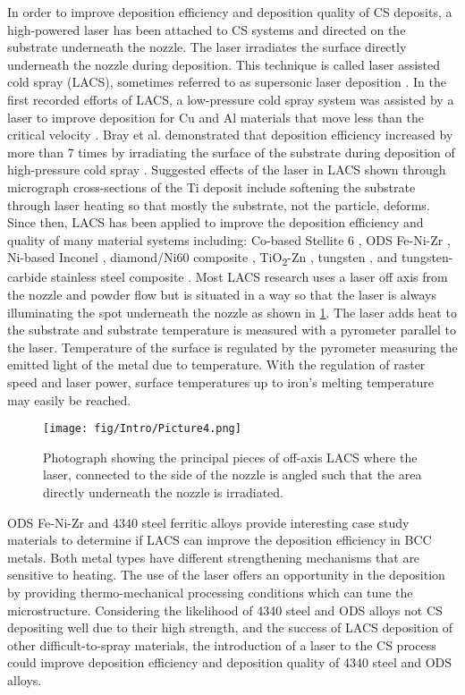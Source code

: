 		
		In order to improve deposition efficiency and deposition quality of CS deposits, a high-powered laser has been attached to CS systems and directed on the substrate underneath the nozzle. The laser irradiates the surface directly underneath the nozzle during deposition. This technique is called laser assisted cold spray (LACS), sometimes referred to as supersonic laser deposition \cite{RN173, RN597}. In the first recorded efforts of LACS, a low-pressure cold spray system was assisted by a laser to improve deposition for Cu and Al materials that move less than the critical velocity \cite{RN3366}. Bray et al. demonstrated that deposition efficiency increased by more than 7 times by irradiating the surface of the substrate during deposition of high-pressure cold spray \cite{RN173}. Suggested effects of the laser in LACS shown through micrograph cross-sections of the Ti deposit include softening the substrate through laser heating so that mostly the substrate, not the particle, deforms. Since then, LACS has been applied to improve the deposition efficiency and quality of many material systems including: Co-based Stellite 6 \cite{RN1390, RN1406, RN780}, ODS Fe-Ni-Zr \cite{RN383}, Ni-based Inconel \cite{RN1397}, diamond/Ni60 composite \cite{RN1407}, TiO\textsubscript{2}-Zn \cite{RN1402}, tungsten \cite{RN156}, and tungsten-carbide stainless steel composite \cite{RN2245}. Most LACS research uses a laser off axis from the nozzle and powder flow but is situated in a way so that the laser is always illuminating the spot underneath the nozzle as shown in \ref{fig:Intro4}. The laser adds heat to the substrate and substrate temperature is measured with a pyrometer parallel to the laser. Temperature of the surface is regulated by the pyrometer measuring the emitted light of the metal due to temperature. With the regulation of raster speed and laser power, surface temperatures up to iron’s melting temperature may easily be reached. 
		
		
		
		
		
	
		\begin{figure}
			\centering
			\texttt{[image: fig/Intro/Picture4.png]}
			\caption{Photograph showing the principal pieces of off-axis LACS where the laser, connected to the side of the nozzle is angled such that the area directly underneath the nozzle is irradiated.}
			\label{fig:Intro4}
		\end{figure}
		
		
		
		
		ODS Fe-Ni-Zr and 4340 steel ferritic alloys provide interesting case study materials to determine if LACS can improve the deposition efficiency in BCC metals. Both metal types have different strengthening mechanisms that are sensitive to heating. The use of the laser offers an opportunity in the deposition by providing thermo-mechanical processing conditions which can tune the microstructure. Considering the likelihood of 4340 steel and ODS alloys not CS depositing well due to their high strength, and the success of LACS deposition of other difficult-to-spray materials, the introduction of a laser to the CS process could improve deposition efficiency and deposition quality of 4340 steel and ODS alloys.
		


